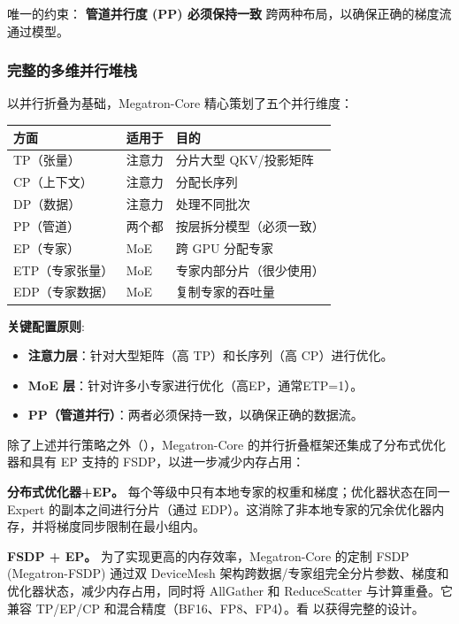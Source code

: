 \documentclass[10pt,logo,copyright]{nvidiatechreport_zh}
\begin{document}
唯一的约束： \textbf{管道并行度 (PP) 必须保持一致} 跨两种布局，以确保正确的梯度流通过模型。
\subsubsection{完整的多维并行堆栈}\label{sec:multi-dim-parallelism}

以并行折叠为基础，Megatron-Core 精心策划了五个并行维度：

\begin{center}
\begin{tabular}{lll}
\toprule
\textbf{方面} & \textbf{适用于} & \textbf{目的} \\
\midrule
TP（张量） & 注意力 & 分片大型 QKV/投影矩阵 \\
CP（上下文） & 注意力 & 分配长序列 \\
DP（数据） & 注意力 & 处理不同批次 \\
PP（管道） & 两个都 & 按层拆分模型（必须一致） \\
\midrule
EP（专家） & MoE & 跨 GPU 分配专家 \\
ETP（专家张量） & MoE & 专家内部分片（很少使用） \\
EDP​​（专家数据） & MoE & 复制专家的吞吐量 \\
\bottomrule
\end{tabular}
\end{center}

\textbf{关键配置原则}:
\begin{itemize}
    \item \textbf{注意力层}：针对大型矩阵（高 TP）和长序列（高 CP）进行优化。
    \item \textbf{MoE 层}：针对许多小专家进行优化（高EP，通常ETP=1）。
    \item \textbf{PP（管道并行）}：两者必须保持一致，以确保正确的数据流。
\end{itemize}

除了上述并行策略之外（），Megatron-Core 的并行折叠框架还集成了分布式优化器和具有 EP 支持的 FSDP，以进一步减少内存占用：

\textbf{分布式优化器+EP。} 每个等级中只有本地专家的权重和梯度；优化器状态在同一 Expert 的副本之间进行分片（通过 EDP）。这消除了非本地专家的冗余优化器内存，并将梯度同步限制在最小组内。

\textbf{FSDP + EP。} 为了实现更高的内存效率，Megatron-Core 的定制 FSDP (Megatron-FSDP) 通过双 DeviceMesh 架构跨数据/专家组完全分片参数、梯度和优化器状态，​​减少内存占用，同时将 AllGather 和 ReduceScatter 与计算重叠。它兼容 TP/EP/CP 和混合精度（BF16、FP8、FP4）。看  以获得完整的设计。
\end{document}
